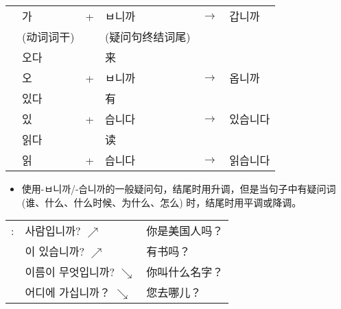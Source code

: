\begin{grammar}
\begin{grammarsect}
\begin{tabular}{llllll}
            &\kr 가&+&\kr ㅂ니까&$\to$&\kr 갑니까\\
            &(动词词干)&&(疑问句终结词尾)\\
            &\kr 오다&&来\\
            &\kr 오&+&\kr ㅂ니까&$\to$&\kr 옵니까\\
            &\kr 있다&&有\\
            &\kr 있&+&\kr 습니다&$\to$&\kr 있습니다\\
            &\kr 읽다&&读\\
            &\kr 읽&+&\kr 습니다&$\to$&\kr 읽습니다\\
        \end{tabular}
    \end{grammarsect}
    \begin{itemize}
        \item 使用{\kr -ㅂ니까/-습니까}的一般疑问句，结尾时用升调，但是当句子中有疑问词 (谁、什么、什么时候、为什么、怎么) 时，结尾时用平调或降调。
    \end{itemize}
    \begin{tabular}{lll}
            \kr \ruby{例}{예}:&\kr \ruby{美國}{미국} 사람입니까? $\nearrow$&你是美国人吗？\\
            &\kr \ruby{冊}{책}이 있습니까? $\nearrow$&有书吗？\\
            &\kr 이름이 무엇입니까? $\searrow$&你叫什么名字？\\
            &\kr 어디에 가십니까？ $\searrow$&您去哪儿？
        \end{tabular}\\
\end{grammar}
